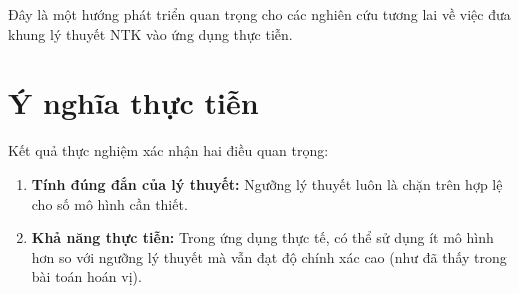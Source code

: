 Đây là một hướng phát triển quan trọng cho các nghiên cứu tương lai về việc đưa khung lý thuyết NTK vào ứng dụng thực tiễn.

\section{Ý nghĩa thực tiễn}

Kết quả thực nghiệm xác nhận hai điều quan trọng:

\begin{enumerate}
    \item \textbf{Tính đúng đắn của lý thuyết:} Ngưỡng lý thuyết luôn là chặn trên hợp lệ cho số mô hình cần thiết.
    \item \textbf{Khả năng thực tiễn:} Trong ứng dụng thực tế, có thể sử dụng ít mô hình hơn so với ngưỡng lý thuyết mà vẫn đạt độ chính xác cao (như đã thấy trong bài toán hoán vị).
\end{enumerate}
